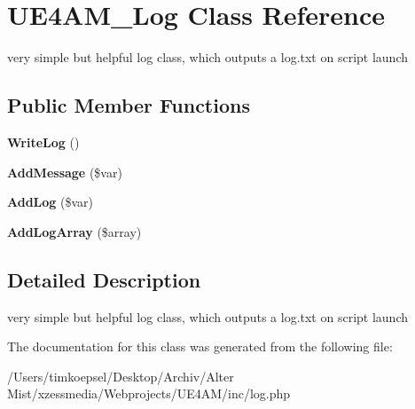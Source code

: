 \hypertarget{class_u_e4_a_m___log}{\section{U\-E4\-A\-M\-\_\-\-Log Class Reference}
\label{class_u_e4_a_m___log}
}


very simple but helpful log class, which outputs a log.\-txt on script launch  


\subsection*{Public Member Functions}
\begin{DoxyCompactItemize}
\item 
\hypertarget{class_u_e4_a_m___log_a2829609acda49134d831405d48547771}{{\bfseries Write\-Log} ()}\label{class_u_e4_a_m___log_a2829609acda49134d831405d48547771}

\item 
\hypertarget{class_u_e4_a_m___log_a8c0d17ad59a3a2b3ecd132a373e664fe}{{\bfseries Add\-Message} (\$var)}\label{class_u_e4_a_m___log_a8c0d17ad59a3a2b3ecd132a373e664fe}

\item 
\hypertarget{class_u_e4_a_m___log_a39d8548a8e51febcd889ec3fffe0d7ed}{{\bfseries Add\-Log} (\$var)}\label{class_u_e4_a_m___log_a39d8548a8e51febcd889ec3fffe0d7ed}

\item 
\hypertarget{class_u_e4_a_m___log_ac26f8c9054a133abb435dd9ff663f6c1}{{\bfseries Add\-Log\-Array} (\$array)}\label{class_u_e4_a_m___log_ac26f8c9054a133abb435dd9ff663f6c1}

\end{DoxyCompactItemize}


\subsection{Detailed Description}
very simple but helpful log class, which outputs a log.\-txt on script launch 

The documentation for this class was generated from the following file\-:\begin{DoxyCompactItemize}
\item 
/\-Users/timkoepsel/\-Desktop/\-Archiv/\-Alter Mist/xzessmedia/\-Webprojects/\-U\-E4\-A\-M/inc/log.\-php\end{DoxyCompactItemize}
